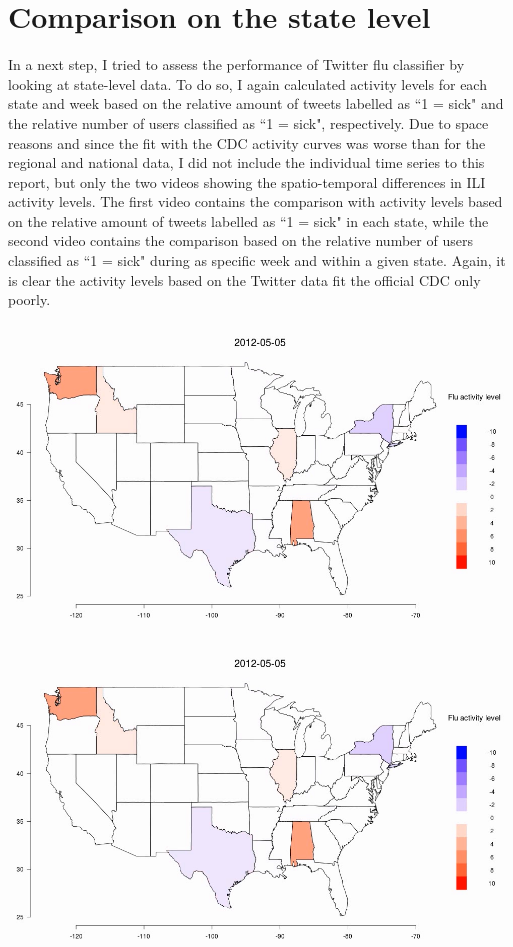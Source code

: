 \documentclass[11pt, a4paper]{report}\usepackage[]{graphicx}\usepackage[]{color}
\begin{document}
\raggedright

\section{Comparison on the state level}
In a next step, I tried to assess the performance of Twitter flu classifier by looking at state-level data. To do so, I again calculated activity levels for each state and week based on the relative amount of tweets labelled as ``1 = sick" and the relative number of users classified as ``1 = sick", respectively. Due to space reasons and since the fit with the CDC activity curves was worse than for the regional and national data, I did not include the individual time series to this report, but only the two videos showing the spatio-temporal differences in ILI activity levels. The first video contains the comparison with activity levels based on the relative amount of tweets labelled as ``1 = sick" in each state, while the second video contains the comparison based on the relative number of users classified as ``1 = sick" during as specific week and within a given state. Again, it is clear the activity levels based on the Twitter data fit the official CDC only poorly.\newline

\centering \href{run:vids/state_Twitter_cdc_diff_full_rel_sick.avi}{\includegraphics[scale=0.5]{vids/ScreenshotState.png}} 

\bigskip

\centering \href{run:vids/state_Twitter_cdc_diff_full_rel_sick_user.avi}{\includegraphics[scale=0.5]{vids/ScreenshotState.png}} 
\end{document}
